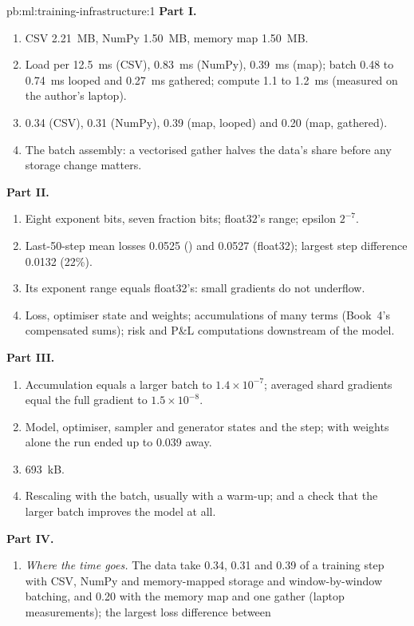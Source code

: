 \begin{solution}{pb:ml:training-infrastructure:1}
\textbf{Part I.}
\begin{enumerate}
\item CSV 2.21~MB, NumPy 1.50~MB, memory map 1.50~MB.
\item Load per  12.5~ms (CSV), 0.83~ms (NumPy), 0.39~ms (map); batch 0.48 to 0.74~ms looped and 0.27~ms gathered; compute
1.1 to 1.2~ms (measured on the author's laptop).
\item 0.34 (CSV), 0.31 (NumPy), 0.39 (map, looped) and 0.20 (map, gathered).
\item The batch assembly: a vectorised gather halves the data's share before any storage change matters.
\end{enumerate}
\textbf{Part II.}
\begin{enumerate}[resume]
\item Eight exponent bits, seven fraction bits; float32's range; epsilon $2^{-7}$.
\item Last-50-step mean losses 0.0525 () and 0.0527 (float32); largest step difference 0.0132 (22\%).
\item Its exponent range equals float32's: small gradients do not underflow.
\item Loss, optimiser state and weights; accumulations of many terms (Book~4's compensated sums); risk and P\&L computations
downstream of the model.
\end{enumerate}
\textbf{Part III.}
\begin{enumerate}[resume]
\item Accumulation equals a larger batch to $1.4\times10^{-7}$; averaged shard gradients equal the full gradient to
$1.5\times10^{-8}$.
\item Model, optimiser, sampler and generator states and the step; with weights alone the run ended up to 0.039 away.
\item 693~kB.
\item Rescaling with the batch, usually with a warm-up; and a check that the larger batch improves the model at all.
\end{enumerate}
\textbf{Part IV.}
\begin{enumerate}[resume]
\item \emph{Where the time goes.} The data take 0.34, 0.31 and 0.39 of a training step with CSV, NumPy and memory-mapped storage and
window-by-window batching, and 0.20 with the memory map and one gather (laptop measurements); the largest loss difference between

\end{enumerate}
\end{solution}
